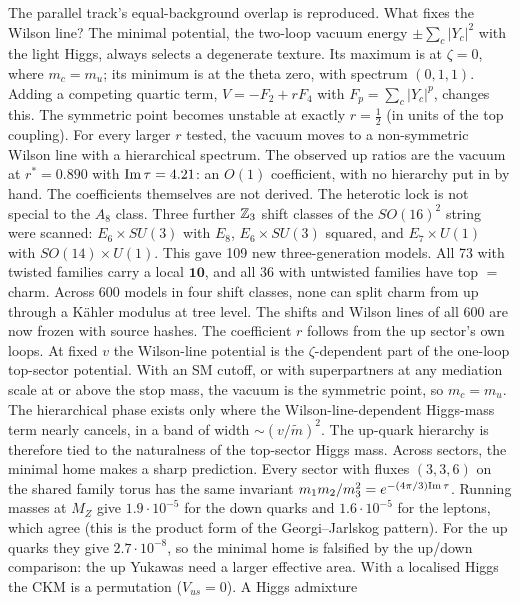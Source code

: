The parallel track's equal-background overlap is reproduced.
What fixes the Wilson line? The minimal potential, the two-loop vacuum energy $\pm\sum_c|Y_c|^2$ with the light
Higgs, always selects a degenerate texture. Its maximum is at $\zeta=0$, where $m_c=m_u$; its minimum is at the theta
zero, with spectrum $(0,1,1)$. Adding a competing quartic term, $V=-F_2+rF_4$ with $F_p=\sum_c|Y_c|^p$, changes this.
The symmetric point becomes unstable at exactly $r=\tfrac12$ (in units of the top coupling). For every larger $r$
tested, the vacuum moves to a non-symmetric Wilson line with a hierarchical spectrum. The observed up ratios are the
vacuum at $r^*=0.890$ with ${\rm Im}\,\tau=4.21$: an $O(1)$ coefficient, with no hierarchy put in by hand. The
coefficients themselves are not derived. 
The heterotic lock is not special to the $A_8$ class. Three further $\mathbb{Z}_3$ shift classes of the $SO(16)^2$ string were
scanned: $E_6\times SU(3)$ with $E_8$, $E_6\times SU(3)$ squared, and $E_7\times U(1)$ with $SO(14)\times U(1)$. This
gave 109 new three-generation models. All 73 with twisted families carry a local $\mathbf{10}$, and all 36 with
untwisted families have top $=$ charm. Across 600 models in four shift classes, none can split charm from up through a
K\"ahler modulus at tree level. The shifts and Wilson lines of all 600 are now frozen with source hashes.
The coefficient $r$ follows from the up sector's own loops. At fixed $v$ the Wilson-line potential is the
$\zeta$-dependent part of the one-loop top-sector potential. With an SM cutoff, or with superpartners at any mediation
scale at or above the stop mass, the vacuum is the symmetric point, so $m_c=m_u$. The hierarchical phase exists only
where the Wilson-line-dependent Higgs-mass term nearly cancels, in a band of width $\sim(v/\tilde m)^2$. The up-quark
hierarchy is therefore tied to the naturalness of the top-sector Higgs mass.
Across sectors, the minimal home makes a sharp prediction. Every sector with fluxes $(3,3,6)$ on the shared family torus
has the same invariant $m_1m_2/m_3^2=e^{-(4\pi/3){\rm Im}\,\tau}$. Running masses at $M_Z$ give $1.9\cdot10^{-5}$ for the
down quarks and $1.6\cdot10^{-5}$ for the leptons, which agree (this is the product form of the Georgi--Jarlskog
pattern). For the up quarks they give $2.7\cdot10^{-8}$, so the minimal home is falsified by the up/down comparison: the
up Yukawas need a larger effective area. With a localised Higgs the CKM is a permutation ($V_{us}=0$). A Higgs admixture
